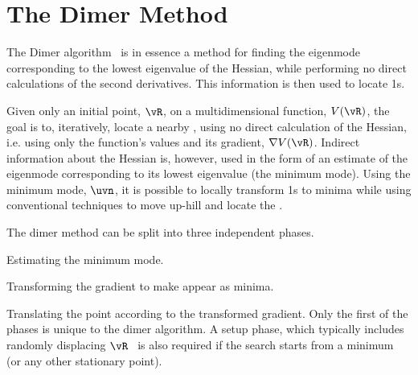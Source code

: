 \section{The Dimer Method}
\label{sec:dimer}


The Dimer algorithm~\cite{dimer-original-1999} is in essence a method for finding the eigenmode corresponding to the lowest eigenvalue of the Hessian, while performing no direct calculations of the second derivatives\cite{hyperdynamics-voter-1997}.
This information is then used to locate \sap1s.

Given only an initial point, $\vR$, on a multidimensional function, $V(\vR)$, the goal is to, iteratively, locate a nearby , using no direct calculation of the Hessian, i.e. using only the function's values and its gradient, $\nabla V(\vR)$.
Indirect information about the Hessian is, however, used in the form of an estimate of the eigenmode corresponding to its lowest eigenvalue (the minimum mode).
Using the minimum mode, $\uvn$, it is possible to locally transform \sap1s to minima while using conventional techniques to move up-hill and locate the .

The dimer method can be split into three independent phases.
\item Estimating the minimum mode.
\item Transforming the gradient to make  appear as minima.
\item Translating the point according to the transformed gradient.
\een
Only the first of the phases is unique to the dimer algorithm.
A setup phase, which typically includes randomly displacing $\vR$~\cite{dimer-sampling-2011} is also required if the search starts from a minimum (or any other stationary point).

